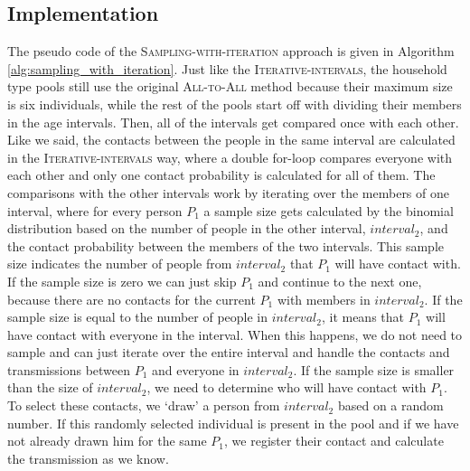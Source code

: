 \subsection{Implementation}
\label{subsec:implementation_sampling_with_iteration}
The pseudo code of the \textsc{Sampling-with-iteration} approach is given in Algorithm \ref{alg:sampling_with_iteration}. Just like the \textsc{Iterative-intervals}, the household type pools still use the original \textsc{All-to-All} method because their maximum size is six individuals, while the rest of the pools start off with dividing their members in the age intervals. Then, all of the intervals get compared once with each other. Like we said, the contacts between the people in the same interval are calculated in the \textsc{Iterative-intervals} way, where a double for-loop compares everyone with each other and only one contact probability is calculated for all of them. The comparisons with the other intervals work by iterating over the members of one interval, where for every person $P_{1}$ a sample size gets calculated by the binomial distribution based on the number of people in the other interval, $interval_{2}$, and the contact probability between the members of the two intervals. This sample size indicates the number of people from $interval_{2}$ that $P_{1}$ will have contact with. If the sample size is zero we can just skip $P_{1}$ and continue to the next one, because there are no contacts for the current $P_{1}$ with members in $interval_{2}$. If the sample size is equal to the number of people in $interval_{2}$, it means that $P_{1}$ will have contact with everyone in the interval. When this happens, we do not need to sample and can just iterate over the entire interval and handle the contacts and transmissions between $P_{1}$ and everyone in $interval_{2}$. If the sample size is smaller than the size of $interval_{2}$, we need to determine who will have contact with $P_{1}$. To select these contacts, we `draw' a person from $interval_{2}$ based on a random number. If this randomly selected individual is present in the pool and if we have not already drawn him for the same $P_{1}$, we register their contact and calculate the transmission as we know.

